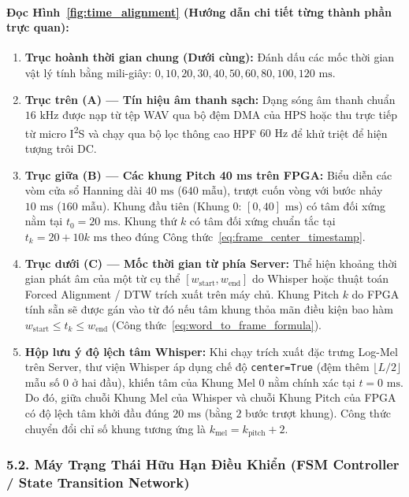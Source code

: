 \documentclass[11pt,a4paper]{article}
\begin{document}
\paragraph{Đọc Hình~\ref{fig:time_alignment} (Hướng dẫn chi tiết từng thành phần trực quan):}
\begin{enumerate}
    \setlength{\itemsep}{1.5pt}
    \item \textbf{Trục hoành thời gian chung (Dưới cùng):} Đánh dấu các mốc thời gian vật lý tính bằng mili-giây: $0, 10, 20, 30, 40, 50, 60, 80, 100, 120\text{ ms}$.
    \item \textbf{Trục trên (A) --- Tín hiệu âm thanh sạch:} Dạng sóng âm thanh chuẩn $16\text{ kHz}$ được nạp từ tệp WAV qua bộ đệm DMA của HPS hoặc thu trực tiếp từ micro I\textsuperscript{2}S và chạy qua bộ lọc thông cao HPF $60\text{ Hz}$ để khử triệt để hiện tượng trôi DC.
    \item \textbf{Trục giữa (B) --- Các khung Pitch 40 ms trên FPGA:} Biểu diễn các vòm cửa sổ Hanning dài $40\text{ ms}$ ($640\text{ mẫu}$), trượt cuốn vòng với bước nhảy $10\text{ ms}$ ($160\text{ mẫu}$). Khung đầu tiên (Khung 0: $[0, 40]\text{ ms}$) có tâm đối xứng nằm tại $t_0 = 20\text{ ms}$. Khung thứ $k$ có tâm đối xứng chuẩn tắc tại $t_k = 20 + 10k\text{ ms}$ theo đúng Công thức~\eqref{eq:frame_center_timestamp}.
    \item \textbf{Trục dưới (C) --- Mốc thời gian từ phía Server:} Thể hiện khoảng thời gian phát âm của một từ cụ thể $[w_{\text{start}}, w_{\text{end}}]$ do Whisper hoặc thuật toán Forced Alignment / DTW trích xuất trên máy chủ. Khung Pitch $k$ do FPGA tính sẵn sẽ được gán vào từ đó nếu tâm khung thỏa mãn điều kiện bao hàm $w_{\text{start}} \le t_k \le w_{\text{end}}$ (Công thức~\eqref{eq:word_to_frame_formula}).
    \item \textbf{Hộp lưu ý độ lệch tâm Whisper:} Khi chạy trích xuất đặc trưng Log-Mel trên Server, thư viện Whisper áp dụng chế độ \texttt{center=True} (đệm thêm $\lfloor L/2 \rfloor$ mẫu số 0 ở hai đầu), khiến tâm của Khung Mel 0 nằm chính xác tại $t = 0\text{ ms}$. Do đó, giữa chuỗi Khung Mel của Whisper và chuỗi Khung Pitch của FPGA có độ lệch tâm khởi đầu đúng $20\text{ ms}$ (bằng $2$ bước trượt khung). Công thức chuyển đổi chỉ số khung tương ứng là $k_{\text{mel}} = k_{\text{pitch}} + 2$.
\end{enumerate}

\subsubsection*{5.2. Máy Trạng Thái Hữu Hạn Điều Khiển (FSM Controller / State Transition Network)}
\end{document}
